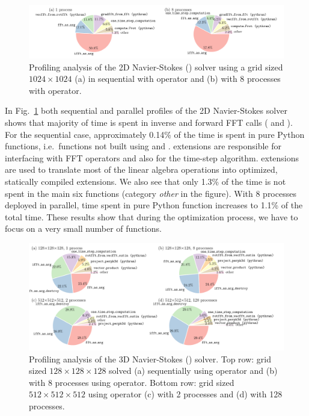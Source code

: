 \begin{figure}[htp]
\centering
\includegraphics[width=\linewidth]{tmp/fig_profile2d}
\caption{Profiling analysis of the 2D Navier-Stokes
() solver using a grid sized $1024\times1024$
(a) in sequential with  operator and (b) with 8
processes with 
operator.}\label{fig:profile2d}
\end{figure}

In Fig.~\ref{fig:profile2d} both sequential and parallel profiles of the 2D
Navier-Stokes solver shows that majority of time is spent in inverse and forward
FFT calls ( and ). For the
sequential case, approximately 0.14\% of the time is spent in pure Python
functions, i.e.\ functions not built using  and .
%
 extensions are responsible for interfacing with FFT operators and
also for the time-step algorithm.   extensions are used to translate
most of the linear algebra operations into optimized, statically compiled
extensions.
%
We also see that only 1.3\% of the time is not spent in the main six functions
(category \emph{other} in the figure).
%
With 8 processes deployed in parallel, time spent in pure Python function
increases to 1.1\% of the total time.
%
These results show that during the optimization process, we have to focus on a
very small number of functions.

\begin{figure}[htp]
\centering
\includegraphics[width=\linewidth]{tmp/fig_profile3d}
\caption{Profiling analysis of the 3D Navier-Stokes
() solver.
%
Top row: grid sized $128\times128\times128$ solved (a) sequentially using
 operator and (b) with 8 processes using
 operator.
%
Bottom row: grid sized $512\times512\times512$ using
 operator (c) with 2 processes and
(d) with 128 processes.}
\label{fig:profile3d}
\end{figure}

